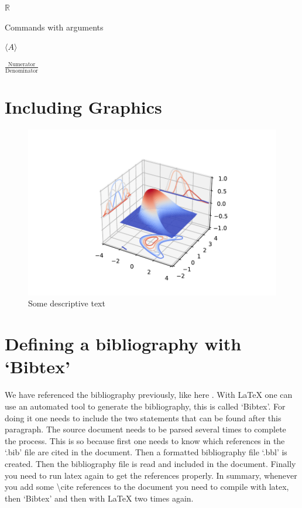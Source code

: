 \documentclass[a4paper]{article}
\begin{document}

\newcommand\R{\mathbb{R}} %


$\R$

Commands with arguments

\newcommand\average[1]{\langle#1\rangle}

$\average{A}$

\newcommand\fraction[2]{\frac{#1}{#2}}

$\fraction{\text{Numerator}}{\text{Denominator}}$


\section{Including Graphics}

\begin{figure}[h]
  \includegraphics{3dplot.pdf}
  \caption{Some descriptive text}\label{referencefigure}
\end{figure}





\section{Defining a bibliography with `Bibtex'}

We have referenced the bibliography previously, like here \cite{Stone1932}. With \LaTeX{} one can use an automated tool to generate the bibliography, this is called `Bibtex'.  For doing it one needs to include the two statements that can be found after this paragraph. The source document needs to be parsed several times to complete the process. This is so because first one needs to know which references in the `.bib' file are cited in the document. Then a formatted bibliography file `.bbl' is created. Then the bibliography file is read and included in the document. Finally you need to run latex again to get the references properly. In summary, whenever you add some \textbackslash{}cite references to the document you need to compile with latex, then `Bibtex' and then with \LaTeX{} two times again. 




\end{document}
